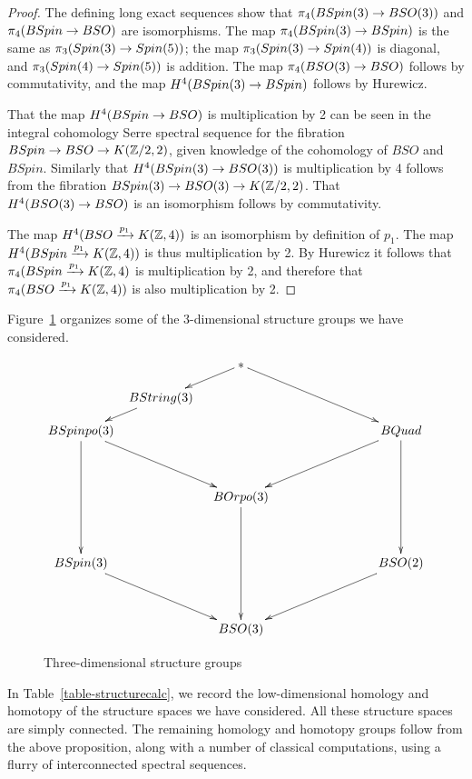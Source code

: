 \documentclass{amsart}
\begin{document}
\begin{proof}
The defining long exact sequences show that $\pi_4(BSpin(3) \rightarrow BSO(3))$ and $\pi_4(BSpin \rightarrow BSO)$ are isomorphisms.  The map $\pi_4(BSpin(3) \rightarrow BSpin)$ is the same as $\pi_3(Spin(3) \rightarrow Spin(5))$; the map $\pi_3(Spin(3) \rightarrow Spin(4))$ is diagonal, and $\pi_3(Spin(4) \rightarrow Spin(5))$ is addition. %
The map $\pi_4(BSO(3) \rightarrow BSO)$ follows by commutativity, and the map $H^4(BSpin(3) \rightarrow BSpin)$ follows by Hurewicz.

That the map $H^4(BSpin \rightarrow BSO)$ is multiplication by 2 can be seen in the integral cohomology Serre spectral sequence for the fibration $BSpin \rightarrow BSO \rightarrow K(\mathbb Z/2,2)$, given knowledge of the cohomology of $BSO$ and $BSpin$.  Similarly that $H^4(BSpin(3) \rightarrow BSO(3))$ is multiplication by 4 follows from the fibration $BSpin(3) \rightarrow BSO(3) \rightarrow K(\mathbb Z/2,2)$.  That $H^4(BSO(3) \rightarrow BSO)$ is an isomorphism follows by commutativity.

The map $H^4(BSO \xrightarrow{p_1} K(\mathbb Z,4))$ is an isomorphism by definition of $p_1$.  The map $H^4(BSpin \xrightarrow{p_1} K(\mathbb Z,4))$ is thus multiplication by 2.  By Hurewicz it follows that $\pi_4(BSpin \xrightarrow{p_1} K(\mathbb Z,4)$ is multiplication by 2, and therefore that $\pi_4(BSO \xrightarrow{p_1} K(\mathbb Z,4))$ is also multiplication by 2.
\end{proof}

Figure~\ref{fig-structuregroups} organizes some of the 3-dimensional structure groups we have considered.
\begin{figure}[!ht]
\begin{equation} \nn
\xymatrix@!R@!C@R=10pt@C=5pt{
&& \ast \ar[dl] \ar[ddrr] && \\
& BString(3) \ar[dl] &&& \\
BSpinpo(3) \ar[ddrr] \ar[dddd] &&&& BQuad \ar[ddll] \ar[dddd] \\
&&&& \\
&& BOrpo(3) \ar[dddd] && \\
&&&& \\
BSpin(3) \ar[ddrr] &&&& BSO(2) \ar[ddll] \\
&&&& \\
&& BSO(3) &&
}
\end{equation}
\caption{Three-dimensional structure groups} \label{fig-structuregroups}
\end{figure}

In Table~\ref{table-structurecalc}, we record the low-dimensional homology and homotopy of the structure spaces we have considered.  All these structure spaces are simply connected.  The remaining homology and homotopy groups follow from the above proposition, along with a number of classical computations, using a flurry of interconnected spectral sequences.  
\end{document}
